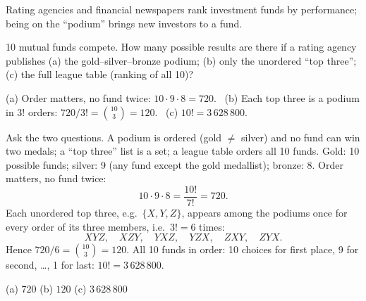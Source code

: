 
\begin{problem}
	\begin{context}
		Rating agencies and financial newspapers rank investment funds by
		performance; being on the ``podium'' brings new investors to a fund.
	\end{context}
	10 mutual funds compete. How many possible results are there if a rating
	agency publishes (a) the gold--silver--bronze podium; (b) only the
	unordered ``top three''; (c) the full league table (ranking of all 10)?
\end{problem}

\begin{slides}
	\small
	\exstatement
	\pause
	\sol (a) Order matters, no fund twice: $10\cdot 9\cdot 8 = 720$.
	\ (b) Each top three is a podium in $3!$ orders: $720/3! = \binom{10}{3}=120$.
	\ (c) $10! = 3\,628\,800$.
\end{slides}

\begin{solution}
	\idea Ask the two questions. A podium is ordered (gold $\ne$ silver) and no
	fund can win two medals; a ``top three'' list is a set; a league table orders
	all 10 funds.
	 Gold: 10 possible funds; silver: 9 (any fund except the gold
	medallist); bronze: 8. Order matters, no fund twice:
	\[ 10\cdot9\cdot8=\frac{10!}{7!}=720. \]
	 Each unordered top three, e.g.\ $\{X,Y,Z\}$, appears among the
	podiums once for every order of its three members, i.e.\ $3!=6$ times:
	\[ XYZ,\quad XZY,\quad YXZ,\quad YZX,\quad ZXY,\quad ZYX. \]
	Hence
	$720/6=\binom{10}{3}=120$.
	 All 10 funds in order: 10 choices for first place, 9 for second,
	\ldots, 1 for last: $10! = 3\,628\,800$.
	\begin{answer}
		(a) $720$ \quad (b) $120$ \quad (c) $3\,628\,800$
	\end{answer}
\end{solution}
